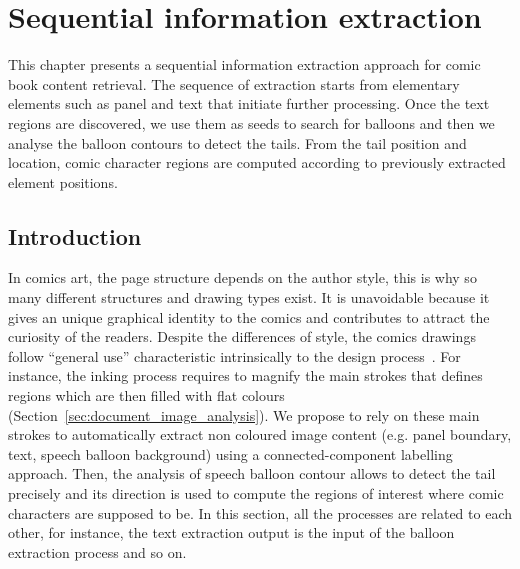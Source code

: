 \chapter{Sequential information extraction}%
\label{chap:sequential}
\graphicspath{{./chapters/3-sequential/figs/}}

This chapter presents a sequential information extraction approach for comic book content retrieval.
The sequence of extraction starts from elementary elements such as panel and text that initiate further processing.
Once the text regions are discovered, we use them as seeds to search for balloons and then we analyse the balloon contours to detect the tails.
From the tail position and location, comic character regions are computed according to previously extracted element positions.


\section{Introduction} %
\label{sec:introduction}

In comics art, the page structure depends on the author style, this is why so many different structures and drawing types exist.
It is unavoidable because it gives an unique graphical identity to the comics and contributes to attract the curiosity of the readers.
Despite the differences of style, the comics drawings follow ``general use'' characteristic intrinsically to the design process~\cite{mccloud2006Making}.
For instance, the inking process requires to magnify the main strokes that defines regions which are then filled with flat colours (Section~\ref{sec:document_image_analysis}).
We propose to rely on these main strokes to automatically extract non coloured image content (e.g. panel boundary, text, speech balloon background) using a connected-component labelling approach.
Then, the analysis of speech balloon contour allows to detect the tail precisely and its direction is used to compute the regions of interest where comic characters are supposed to be.
In this section, all the processes are related to each other, for instance, the text extraction output is the input of the balloon extraction process and so on.


